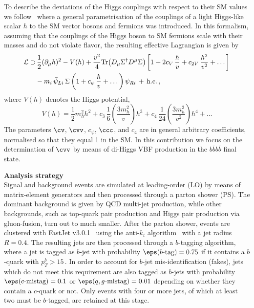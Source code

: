To describe the deviations of the Higgs couplings with respect to their SM values we follow~\cite{Contino:2010mh} where a general parametrisation of the	couplings of a light Higgs-like scalar $h$ to the SM vector bosons and fermions was introduced.
%
In this formalism, assuming that the couplings of the Higgs boson to SM fermions scale with their masses and
do not violate flavor, the resulting effective Lagrangian is given by
\begin{equation}
\label{eq:lagrangian}
\begin{split}
{\cal L}  \supset
& \, \frac{1}{2}(\partial_\mu h)^2 - V(h) +\frac{v^2}{4}{\rm Tr}\!\left (D_\mu \Sigma^\dagger D^\mu \Sigma\right )
\left [ 1+2c_V\, \frac{h}{v}+c_{2V}\,\frac{h^2}{v^2}+\dots\right ] \\
&-m_i\,\bar \psi_{Li}\, \Sigma\left (1+c_{\psi}\,\frac{h}{v} + \dots \right)\psi_{Ri}\,+\,{\rm h.c.}\, ,
\end{split}
\end{equation}
%
where $V(h)$ denotes the Higgs potential, 
%
\begin{equation}
V(h) = \frac{1}{2} m_h^2 h^2 + c_3\, \frac{1}{6} \left( \frac{3m_h^2}{v} \right) h^3 + c_4\, \frac{1}{24} \left( \frac{3m_h^2}{v^2} \right) h^4 + \dots
\end{equation}
%
The parameters $\cv$, $\cvv$, $c_{\psi}$, $\ccc$, and $c_4$ are in general
arbitrary coefficients, normalised so that they equal 1 in the SM.
%
In this contribution we focus on the determination of $\cvv$ by means
of di-Higgs VBF production in the $b\bar{b}b\bar{b}$ final state.

\noindent
{\bf Analysis strategy}\\
Signal and background events are simulated at leading-order (LO) by means of
matrix-element  generators and then processed through a parton shower (PS).
%
The dominant background is given by QCD multi-jet production,
while other backgrounds, such as top-quark pair production and 
Higgs pair production via
gluon-fusion, turn out to much smaller.
%
After the parton shower, events are clustered with 
{\sc\small FastJet} v3.0.1~\cite{Cacciari:2011ma} using the
anti-$k_t$ algorithm~\cite{Cacciari:2008gp} with a jet radius $R=0.4$.
%
The resulting jets are then processed through a $b$-tagging algorithm,
where a jet is tagged as $b$-jet with probability $\eps(b\text{-tag})=0.75$ 
if it contains a $b$-quark with $p_T^b > 15\,$\UGeV.
%
In order to account for $b$-jet mis-identification (fakes),
jets which do not meet this requirement
are also tagged as $b$-jets with probability $\eps(c\text{-mistag})=0.1$ or $\eps(q,g\text{-mistag})=0.01$
depending on whether they contain a $c$-quark or not.
%
Only events with four or more jets, of which at least two
must be $b$-tagged, are retained at this stage.


